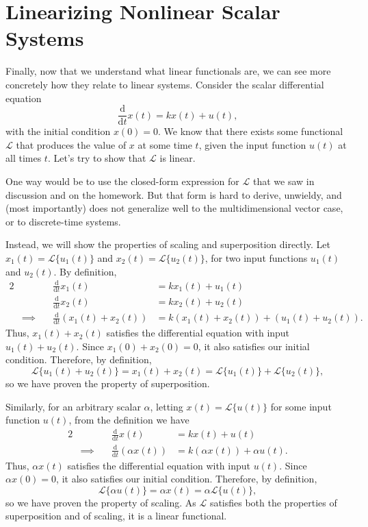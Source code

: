 \documentclass[letterpaper]{article}
\theoremstyle{remark}
\newcommand{\dt}{\mathrm{d}t}
\newcommand{\diff}{\mathrm{d}}
\newcommand{\eqn}[1]{\begin{alignat*}{2}#1\end{alignat*}}
\newcommand*{\thus}{&\implies\quad&}
\begin{document}
\section{Linearizing Nonlinear Scalar Systems}
Finally, now that we understand what linear functionals are, we can see more concretely how they relate to linear systems. Consider the scalar differential equation
\[
    \frac{\diff}{\dt} x(t) = kx(t) + u(t),
\]
with the initial condition $x(0) = 0$. We know that there exists some functional $\mathcal{L}$ that produces the value of $x$ at some time $t$, given the input function $u(t)$ at all times $t$. Let's try to show that $\mathcal{L}$ is linear.

One way would be to use the closed-form expression for $\mathcal{L}$ that we saw in discussion and on the homework. But that form is hard to derive, unwieldy, and (most importantly) does not generalize well to the multidimensional vector case, or to discrete-time systems.

Instead, we will show the properties of scaling and superposition directly. Let $x_1(t) = \mathcal{L}\{u_1(t)\}$ and $x_2(t) = \mathcal{L}\{u_2(t)\}$, for two input functions $u_1(t)$ and $u_2(t)$. By definition,
\eqn{
    && \frac{\diff}{\dt} x_1(t) &= kx_1(t) + u_1(t) \\
    && \frac{\diff}{\dt} x_2(t) &= kx_2(t) + u_2(t) \\
    \thus \frac{\diff}{\dt} (x_1(t) + x_2(t)) &= k(x_1(t) + x_2(t)) + (u_1(t) + u_2(t)).
}
Thus, $x_1(t) + x_2(t)$ satisfies the differential equation with input $u_1(t) + u_2(t)$. Since $x_1(0) + x_2(0) = 0$, it also satisfies our initial condition. Therefore, by definition,
\[
    \mathcal{L}\{u_1(t) + u_2(t)\} = x_1(t) + x_2(t) = \mathcal{L}\{u_1(t)\} + \mathcal{L}\{u_2(t)\},
\]
so we have proven the property of superposition. 

Similarly, for an arbitrary scalar $\alpha$, letting $x(t) = \mathcal{L}\{u(t)\}$ for some input function $u(t)$, from the definition we have
\eqn{
    && \frac{\diff}{\dt} x(t) &= kx(t) + u(t) \\
    \thus \frac{\diff}{\dt} (\alpha x(t)) &= k(\alpha x(t)) + \alpha u(t).
}
Thus, $\alpha x(t)$ satisfies the differential equation with input $u(t)$. Since $\alpha x(0) = 0$, it also satisfies our initial condition. Therefore, by definition,
\[
    \mathcal{L}\{\alpha u(t)\} = \alpha x(t) = \alpha\mathcal{L}\{u(t)\},
\]
so we have proven the property of scaling. As $\mathcal{L}$ satisfies both the properties of superposition and of scaling, it is a linear functional.
\end{document}
